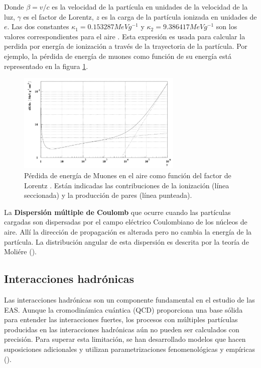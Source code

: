 Donde $\beta = v/c $ es la velocidad de la partícula en unidades de la velocidad de la luz, $\gamma$ es el factor de Lorentz, $z$ es la carga de la partícula ionizada en unidades de $e$. Las dos constantes $\kappa_{1}= 0.153287 MeV g^{-1}$ y $\kappa_{2}= 9.386417 MeV g^{-1}$ son los valores correspondientes para el aire \cite{Heck1998}. Esta expresión es usada para calcular la perdida por energía de ionización a través de la trayectoria de la partícula. Por ejemplo, la pérdida de energía de muones como función de su energía está representado en la figura \ref{fig:fig4}.
\begin{figure}[htb!]
\centering
        \includegraphics[width=0.7\textwidth]{Figs/Bethe_Muons.png}
        \caption[Ecuación de Bethe-Bloch para los muones.]{Pérdida de energía de Muones en el aire como función del factor de Lorentz \cite{Heck1998}. Están indicadas las contribuciones de la ionización (línea seccionada) y la producción de pares (línea punteada).}
        \label{fig:fig4}
\end{figure}

La \textbf{Dispersión múltiple de Coulomb} que ocurre cuando las partículas cargadas son dispersadas por el campo eléctrico Coulombiano de los núcleos de aire. Allí la dirección de propagación es alterada pero no cambia la energía de la partícula. La distribución angular de esta dispersión es descrita por la teoría de Moliére (\cite{Heck1998}).  

\subsection{Interacciones hadrónicas}
Las interacciones hadrónicas son un componente fundamental en el estudio de las EAS. Aunque la cromodinámica cuántica (QCD) proporciona una base sólida para entender las interacciones fuertes, los procesos con múltiples partículas producidas en las interacciones hadrónicas aún no pueden ser calculados con precisión. Para superar esta limitación, se han desarrollado modelos que hacen suposiciones adicionales y utilizan parametrizaciones fenomenológicas y empíricas (\cite{Allen}).

